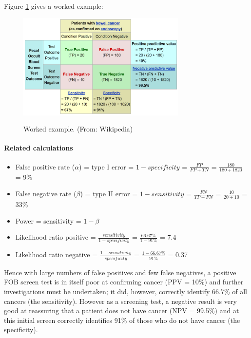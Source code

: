 Figure \ref{fig:sens_spec_example} gives a worked example:

\begin{figure}[ht]
  \centering
  \includegraphics[width=0.75\textwidth]{../Images/Sensitivity_Specificity_Example.png}\\
  \caption{Worked example. (From: Wikipedia)}\label{fig:sens_spec_example}
\end{figure}

\paragraph{Related calculations}

\begin{itemize}
  \item False positive rate ($\alpha$) = type I error = $1 - specificity$ = $\frac{FP}{FP + TN}$ = $\frac{180}{180+1820}$ = 9\%
  \item False negative rate ($\beta$) = type II error = $1 - sensitivity$ = $\frac{FN}{TP + FN}$ = $\frac{10}{20+10}$ = 33\%
  \item Power = sensitivity = $1−\beta$
  \item Likelihood ratio positive = $\frac{sensitivity}{1−specificity}$ = $\frac{66.67\%}{1−91\%}$ = 7.4
  \item Likelihood ratio negative = $\frac{1−sensitivity}{specificity}$ = $\frac{1−66.67\%}{91\%}$ = 0.37
\end{itemize}

Hence with large numbers of false positives and few false negatives, a positive FOB screen test is in itself poor at confirming cancer (PPV = 10\%) and further investigations must be undertaken; it did, however, correctly identify 66.7\% of all cancers (the sensitivity). However as a screening test, a negative result is very good at reassuring that a patient does not have cancer (NPV = 99.5\%) and at this initial screen correctly identifies 91\% of those who do not have cancer (the specificity).

